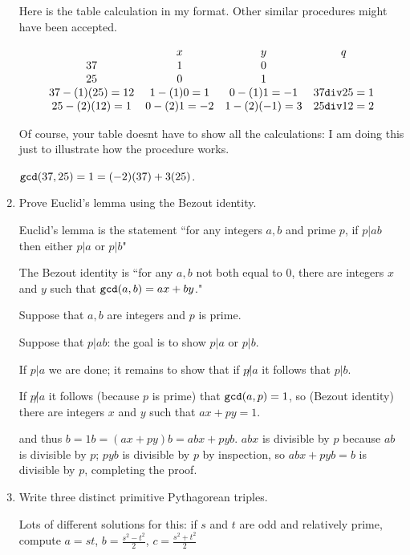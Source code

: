 \documentclass[12pt]{article}
\begin{document}
\begin{enumerate}
Here is the table calculation in my format.  Other similar procedures might have been accepted.

$$\begin{array}{cccc}
 & x & y & q \\
37 & 1 & 0 & \\
25 & 0 & 1 & \\
 37 - (1)(25) = 12   & 1-(1)0 = 1   &0 - (1)1 = -1  & 37 {\tt div} 25 = 1\\ 
 25-(2)(12)=1&  0-(2)1 = -2 &    1-(2)(-1) = 3                & 25 {\tt div} 12 = 2 \\

\end{array}$$

Of course, your table doesnt have to show all the calculations:  I am doing this just to illustrate how the procedure works.

${\tt gcd}(37,25) = 1 = (-2)(37) + 3(25)$.

\newpage

\item  Prove Euclid's lemma using the Bezout identity.

Euclid's lemma is the statement ``for any integers $a,b$ and prime $p$, if $p|ab$ then either $p|a$ or $p|b$"

The Bezout identity is ``for any $a,b$ not both equal to 0, there are integers $x$ and $y$ such that ${\tt gcd}(a,b) = ax+by$."

Suppose that $a,b$ are integers and $p$ is prime.

Suppose that $p|ab$:  the goal is to show $p|a$ or $p|b$.

If $p|a$ we are done;  it remains to show that if $p \not|a$ it follows that $p|b$.

If $p \not|a$ it follows (because $p$ is prime) that ${\tt gcd}(a,p) = 1$,
so (Bezout identity) there are integers $x$ and $y$ such that $ax+py=1$.

and thus $b=1b = (ax+py)b = abx + pyb$.  $abx$ is divisible by $p$ because $ab$ is divisible by $p$;
$pyb$ is divisible by $p$ by inspection, so $abx + pyb = b$ is divisible by $p$, completing the proof.

\newpage

\item   Write three distinct primitive Pythagorean triples.

Lots of different solutions for this:  if $s$ and $t$ are odd and relatively prime, compute $a=st$, $b=\frac{s^2-t^2}2$, $c=\frac{s^2+t^2}2$


\end{enumerate}
\end{document}
